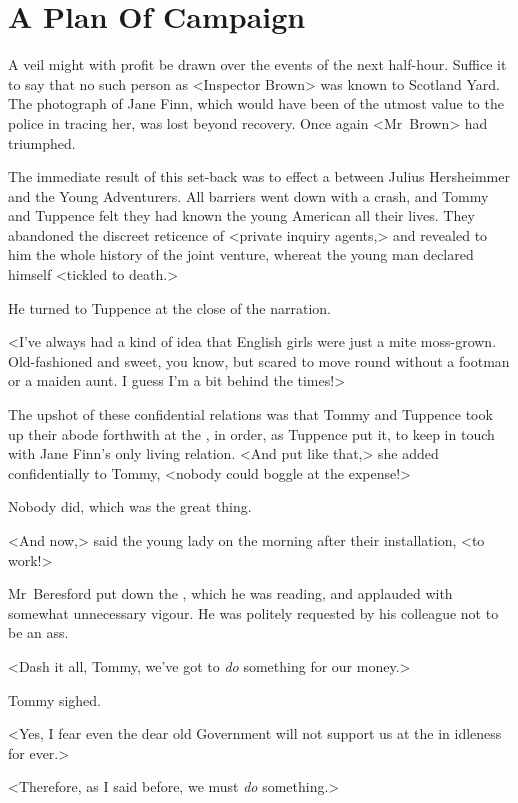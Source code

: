 \chapter{A Plan Of Campaign} 

 \lettrine{A}{} veil might with profit be drawn over the events of the next half-hour. Suffice it to say that no such person as <Inspector Brown> was known to Scotland Yard. The photograph of Jane Finn, which would have been of the utmost value to the police in tracing her, was lost beyond recovery. Once again <Mr~Brown> had triumphed.

The immediate result of this set-back was to effect a  between Julius Hersheimmer and the Young Adventurers. All barriers went down with a crash, and Tommy and Tuppence felt they had known the young American all their lives. They abandoned the discreet reticence of <private inquiry agents,> and revealed to him the whole history of the joint venture, whereat the young man declared himself <tickled to death.>

He turned to Tuppence at the close of the narration.

<I've always had a kind of idea that English girls were just a mite moss-grown. Old-fashioned and sweet, you know, but scared to move round without a footman or a maiden aunt. I guess I'm a bit behind the times!>

The upshot of these confidential relations was that Tommy and Tuppence took up their abode forthwith at the , in order, as Tuppence put it, to keep in touch with Jane Finn's only living relation. <And put like that,> she added confidentially to Tommy, <nobody could boggle at the expense!>

Nobody did, which was the great thing.

<And now,> said the young lady on the morning after their installation, <to work!>

Mr~Beresford put down the , which he was reading, and applauded with somewhat unnecessary vigour. He was politely requested by his colleague not to be an ass.

<Dash it all, Tommy, we've got to \emph{do} something for our money.>

Tommy sighed.

<Yes, I fear even the dear old Government will not support us at the  in idleness for ever.>

<Therefore, as I said before, we must \emph{do} something.>

